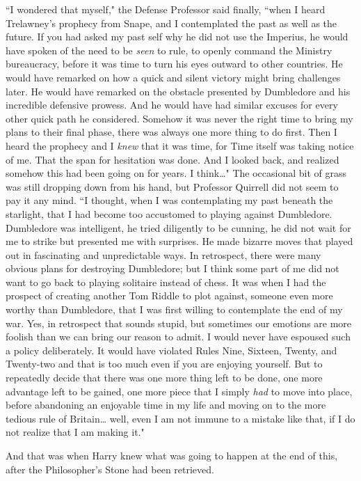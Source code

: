 ``I wondered that myself," the Defense Professor said finally, ``when I heard Trelawney's prophecy from Snape, and I contemplated the past as well as the future. If you had asked my past self why he did not use the Imperius, he would have spoken of the need to be \emph{seen} to rule, to openly command the Ministry bureaucracy, before it was time to turn his eyes outward to other countries. He would have remarked on how a quick and silent victory might bring challenges later. He would have remarked on the obstacle presented by Dumbledore and his incredible defensive prowess. And he would have had similar excuses for every other quick path he considered. Somehow it was never the right time to bring my plans to their final phase, there was always one more thing to do first. Then I heard the prophecy and I \emph{knew} that it was time, for Time itself was taking notice of me. That the span for hesitation was done. And I looked back, and realized somehow this had been going on for years. I think{\ldots}" The occasional bit of grass was still dropping down from his hand, but Professor Quirrell did not seem to pay it any mind. ``I thought, when I was contemplating my past beneath the starlight, that I had become too accustomed to playing against Dumbledore. Dumbledore was intelligent, he tried diligently to be cunning, he did not wait for me to strike but presented me with surprises. He made bizarre moves that played out in fascinating and unpredictable ways. In retrospect, there were many obvious plans for destroying Dumbledore; but I think some part of me did not want to go back to playing solitaire instead of chess. It was when I had the prospect of creating another Tom Riddle to plot against, someone even more worthy than Dumbledore, that I was first willing to contemplate the end of my war. Yes, in retrospect that sounds stupid, but sometimes our emotions are more foolish than we can bring our reason to admit. I would never have espoused such a policy deliberately. It would have violated Rules Nine, Sixteen, Twenty, and Twenty-two and that is too much even if you are enjoying yourself. But to repeatedly decide that there was one more thing left to be done, one more advantage left to be gained, one more piece that I simply \emph{had} to move into place, before abandoning an enjoyable time in my life and moving on to the more tedious rule of Britain{\ldots} well, even I am not immune to a mistake like that, if I do not realize that I am making it."

And that was when Harry knew what was going to happen at the end of this, after the Philosopher's Stone had been retrieved.

